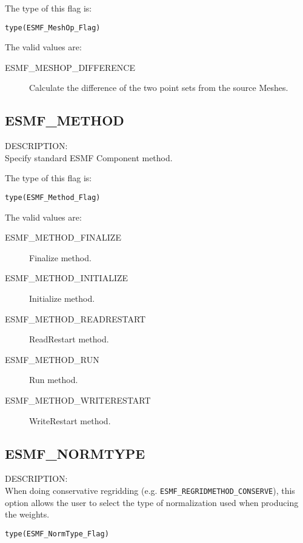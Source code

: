 The type of this flag is:

{\tt type(ESMF\_MeshOp\_Flag)}

The valid values are:
\begin{description}

\item [ESMF\_MESHOP\_DIFFERENCE]
         Calculate the difference of the two point sets from the source Meshes.
\end{description}

\subsection{ESMF\_METHOD}
\label{const:method}

{\sf DESCRIPTION:\\}  
Specify standard ESMF Component method.

The type of this flag is:

{\tt type(ESMF\_Method\_Flag)}

The valid values are:
\begin{description}
\item [ESMF\_METHOD\_FINALIZE]
      Finalize method.
\item [ESMF\_METHOD\_INITIALIZE]
      Initialize method.
\item [ESMF\_METHOD\_READRESTART]
      ReadRestart method.
\item [ESMF\_METHOD\_RUN]
      Run method.
\item [ESMF\_METHOD\_WRITERESTART]
      WriteRestart method.
\end{description}



\subsection{ESMF\_NORMTYPE}

\label{opt:normType}

{\sf DESCRIPTION:\\}  When doing conservative regridding (e.g. {\tt ESMF\_REGRIDMETHOD\_CONSERVE}), this option allows the user to select the type of normalization used when producing the weights. 

{\tt type(ESMF\_NormType\_Flag)}

